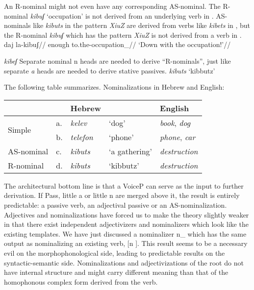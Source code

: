 An R-nominal might not even have any corresponding AS-nominal. The R-nominal \emph{kibuʃ} `occupation' is not derived from an underlying verb in \tpie. AS-nominals like \emph{kibuts} in the pattern \emph{XiuZ} are derived from verbs like \emph{kibets} in \tpie, but the R-nominal \emph{kibuʃ} which has the pattern \emph{XiuZ} is not derived from a verb in \tpie.
\pex
	\a \begingl
		\gla daj la-kibuʃ//
		\glb enough to.the-occupation_{}//
		\glft `Down with the occupation!'//
	\endgl
	
	\a \ljudge{*} \emph{kibeʃ}
\xe
Separate nominal n heads are needed to derive ``R-nominals'', just like separate \emph{a} heads are needed to derive stative passives.
\ex
	\emph{kibuts} `kibbutz'\\
\xe

The following table summarizes.
\ex Nominalizations in Hebrew and English:\\
	\begin{tabular}{l|lll|l}
	 & & Hebrew & & English\\\hline
	\multirow{2}{*}{Simple}     & a. & \emph{kelev} & `dog' & \emph{book}, \emph{dog}\\
			&    b. & \emph{telefon} & `phone' & \emph{phone}, \emph{car}\\\hline
	AS-nominal & c. & \emph{kibuts} & `a gathering' & \emph{destruction}\\\hline
	R-nominal  & d. & \emph{kibuts} & `kibbutz'     & \emph{destruction}\\
	\end{tabular}
\xe

The architectural bottom line is that a VoiceP can serve as the input to further derivation. If Pass, little a or little n are merged above it, the result is entirely predictable: a passive verb, an adjectival passive or an AS-nominalization. Adjectives and nominalizations have forced us to make the theory slightly weaker in that there exist independent adjectivizers and nominalizers which look like the existing templates. We have just discussed a nominalizer n_{} which has the same output as nominalizing an existing verb, [n \tpie]. This result seems to be a necessary evil on the morphophonological side, leading to predictable results on the syntactic-semantic side. Nominalizations and adjectivizations of the root do not have internal structure and might carry different meaning than that of the homophonous complex form derived from the verb.

